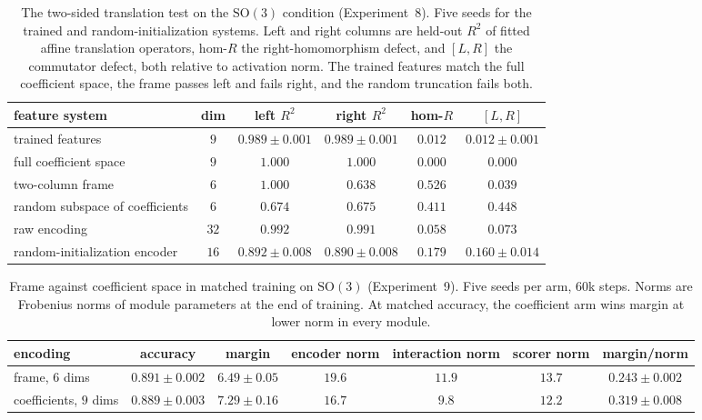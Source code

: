 \documentclass{article}
\newcommand{\SO}{\mathrm{SO}}
\begin{document}
\begin{table}[t]
\centering
\caption{The two-sided translation test on the $\SO(3)$ condition
(Experiment~8). Five seeds for the trained and random-initialization
systems. Left and right columns are held-out $R^2$ of fitted affine
translation operators, hom-$R$ the right-homomorphism defect, and
$[L,R]$ the commutator defect, both relative to activation norm. The
trained features match the full coefficient space, the frame passes
left and fails right, and the random truncation fails both.}
\label{tab:twosided}
\scriptsize
\begin{tabular}{lccccc}
\toprule
feature system & dim & left $R^2$ & right $R^2$ & hom-$R$ & $[L,R]$ \\
\midrule
trained features & $9$ & $0.989 \pm 0.001$ & $0.989 \pm 0.001$ & $0.012$ & $0.012 \pm 0.001$ \\
full coefficient space & $9$ & $1.000$ & $1.000$ & $0.000$ & $0.000$ \\
two-column frame & $6$ & $1.000$ & $0.638$ & $0.526$ & $0.039$ \\
random subspace of coefficients & $6$ & $0.674$ & $0.675$ & $0.411$ & $0.448$ \\
raw encoding & $32$ & $0.992$ & $0.991$ & $0.058$ & $0.073$ \\
random-initialization encoder & $16$ & $0.892 \pm 0.008$ & $0.890 \pm 0.008$ & $0.179$ & $0.160 \pm 0.014$ \\
\bottomrule
\end{tabular}
\end{table}

\begin{table}[t]
\centering
\caption{Frame against coefficient space in matched training on
$\SO(3)$ (Experiment~9). Five seeds per arm, $60$k steps. Norms are
Frobenius norms of module parameters at the end of training. At
matched accuracy, the coefficient arm wins margin at lower norm in
every module.}
\label{tab:cost}
\scriptsize
\begin{tabular}{lcccccc}
\toprule
encoding & accuracy & margin & encoder norm & interaction norm & scorer norm & margin/norm \\
\midrule
frame, $6$ dims & $0.891 \pm 0.002$ & $6.49 \pm 0.05$ & $19.6$ & $11.9$ & $13.7$ & $0.243 \pm 0.002$ \\
coefficients, $9$ dims & $0.889 \pm 0.003$ & $7.29 \pm 0.16$ & $16.7$ & $9.8$ & $12.2$ & $0.319 \pm 0.008$ \\
\bottomrule
\end{tabular}
\end{table}
\end{document}
